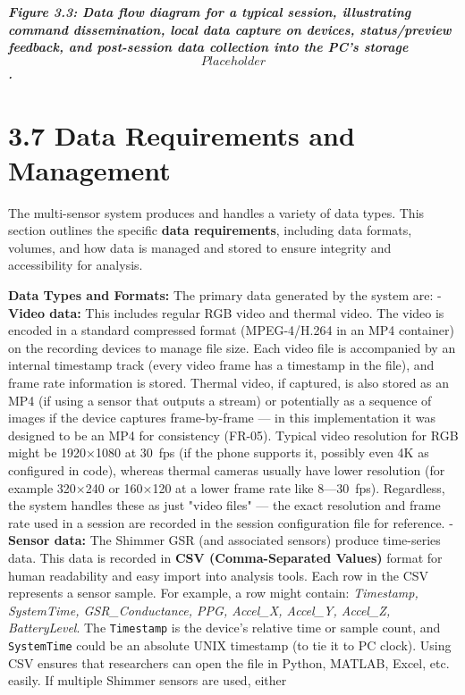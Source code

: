 \documentclass[11pt,a4paper]{report}
\begin{document}
\textit{\textbf{Figure 3.3: Data flow diagram for a typical session, illustrating
command dissemination, local data capture on devices, status/preview
feedback, and post-session data collection into the PC's storage
\[Placeholder\].}}

\section{3.7 Data Requirements and Management}

The multi-sensor system produces and handles a variety of data types.
This section outlines the specific \textbf{data requirements}, including data
formats, volumes, and how data is managed and stored to ensure integrity
and accessibility for analysis.

\textbf{Data Types and Formats:} The primary data generated by the system
are: - \textbf{Video data:} This includes regular RGB video and thermal
video. The video is encoded in a standard compressed format
(MPEG-4/H.264 in an MP4 container) on the recording devices to manage
file size. Each video file is accompanied by an internal timestamp track
(every video frame has a timestamp in the file), and frame rate
information is stored. Thermal video, if captured, is also stored as an
MP4 (if using a sensor that outputs a stream) or potentially as a
sequence of images if the device captures frame-by-frame --- in this
implementation it was designed to be an MP4 for consistency (FR-05).
Typical video resolution for RGB might be 1920×1080 at 30 fps (if the
phone supports it, possibly even 4K as configured in
code),
whereas thermal cameras usually have lower resolution (for example
320×240 or 160×120 at a lower frame rate like 8---30 fps). Regardless,
the system handles these as just "video files" --- the exact resolution
and frame rate used in a session are recorded in the session
configuration
file\cite{DriverStressThermal2020}
for reference. - \textbf{Sensor data:} The Shimmer GSR (and associated
sensors) produce time-series data. This data is recorded in \textbf{CSV
(Comma-Separated Values)} format for human readability and easy import
into analysis tools. Each row in the CSV represents a sensor sample. For
example, a row might contain: \textit{Timestamp, SystemTime, GSR\_Conductance,
PPG, Accel\_X, Accel\_Y, Accel\_Z,
BatteryLevel}.
The \texttt{Timestamp} is the device's relative time or sample count, and
\texttt{SystemTime} could be an absolute UNIX timestamp (to tie it to PC
clock). Using CSV ensures that researchers can open the file in Python,
MATLAB, Excel, etc. easily. If multiple Shimmer sensors are used, either
\end{document}
